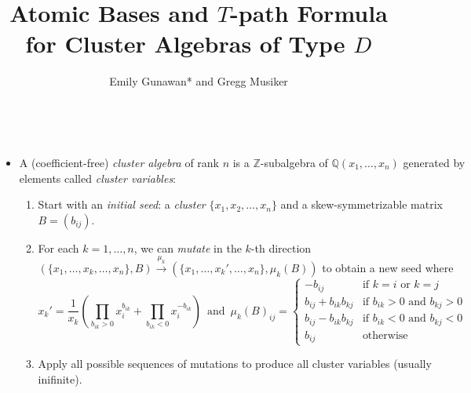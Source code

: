 \documentclass[a0paper, portrait, 17pt]{tikzposter}
\title{Atomic Bases and $T$-path Formula for Cluster Algebras of Type $D$} \author{Emily Gunawan* and Gregg Musiker}
\institute{University of Minnesota, School of Mathematics, Minneapolis, USA}
\begin{document}
 \maketitle
\begin{columns}
%

 {
\begin{itemize}

\item 
A (coefficient-free) \emph{cluster algebra}  of rank $n$  is a $\mathbb{Z}$-subalgebra of $\mathbb{Q}(x_1, \dots, x_n)$
generated by elements called \emph{cluster variables}:

\begin{enumerate}[-]
\item Start with an \emph{initial seed}: a \emph{cluster} $\{ x_1, x_2, \dots, x_n\}$
and a skew-symmetrizable matrix $B=(b_{ij})$.
\item For each $k=1,\dots,n$, we can \emph{mutate} in the $k$-th direction
$\left( \{ x_1, \dots, {x_k}, \dots, x_n\},B \right) \overset{\mu_k}{\longrightarrow} 
\left( \{ x_1, \dots, {x_k'}, \dots, x_n\}, \mu_k(B) \right)$
to obtain a new seed
where 
\[x_k' =\frac{1}{x_k}\left( {\prod_{b_{ik}>0} x_i^{b_{ik}} + \prod_{b_{ik}<0} x_i^{-b_{ik}}}\right)
\, \text{ and }\, \mu_k(B)_{ij}=
 \begin{cases}
 - b_{ij}&\text{if $k=i$ or $k=j$} \\
b_{ij} + b_{ik}b_{kj} &\text{if $b_{ik}>0$ and $b_{kj}>0$}\\
b_{ij} - b_{ik}b_{kj} &\text{if $b_{ik}<0$ and $b_{kj}<0$}\\
b_{ij} &\text{otherwise}
\end{cases}\]
\item Apply all possible sequences of mutations to produce all cluster variables (usually inifinite).
\end{enumerate}

%
%
\end{itemize}

}
\end{columns}
\end{document}
